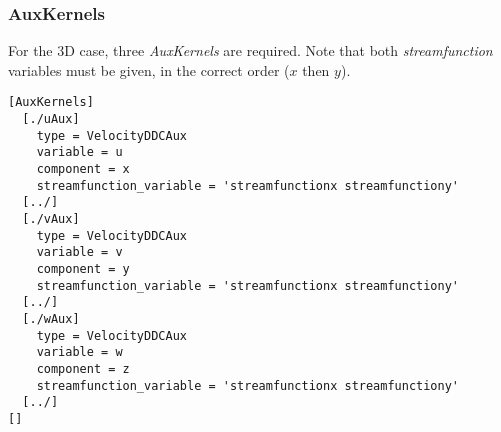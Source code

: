 \documentclass[11pt, a4paper]{csiroreport2012}
\begin{document}
\subsubsection*{AuxKernels}

For the 3D case, three \emph{AuxKernels} are required. Note that both \emph{streamfunction} variables must be given, in the correct order ($x$ then $y$). 
\begin{verbatim}
[AuxKernels]
  [./uAux]
    type = VelocityDDCAux
    variable = u
    component = x
    streamfunction_variable = 'streamfunctionx streamfunctiony'
  [../]
  [./vAux]
    type = VelocityDDCAux
    variable = v
    component = y
    streamfunction_variable = 'streamfunctionx streamfunctiony'
  [../]
  [./wAux]
    type = VelocityDDCAux
    variable = w
    component = z
    streamfunction_variable = 'streamfunctionx streamfunctiony'
  [../]
[]
\end{verbatim}
\end{document}
